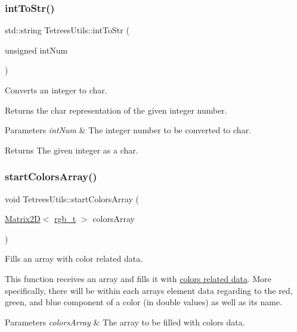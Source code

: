 \subsubsection{\texorpdfstring{int\+To\+Str()}{intToStr()}}
{\footnotesize\ttfamily std\+::string Tetrees\+Utils\+::int\+To\+Str (\begin{DoxyParamCaption}\item[{unsigned}]{int\+Num }\end{DoxyParamCaption})}



Converts an integer to char. 

Returns the char representation of the given integer number. 
\begin{DoxyParams}{Parameters}
{\em int\+Num} & The integer number to be converted to char. \\
\hline
\end{DoxyParams}
\begin{DoxyReturn}{Returns}
The given integer as a char. 
\end{DoxyReturn}
\mbox{\label{classTetreesUtils_afaeab256a68024309eefbbdfae158397}} 
\subsubsection{\texorpdfstring{start\+Colors\+Array()}{startColorsArray()}}
{\footnotesize\ttfamily void Tetrees\+Utils\+::start\+Colors\+Array (\begin{DoxyParamCaption}\item[{\hyperlink{classMatrix2D}{Matrix2D}$<$ \hyperlink{structrgb__t}{rgb\+\_\+t} $>$}]{colors\+Array }\end{DoxyParamCaption})}



Fills an array with color related data. 

This function receives an array and fills it with \hyperlink{structrgb__t}{colors related data}. More specifically, there will be within each array\textquotesingle{}s element data regarding to the red, green, and blue component of a color (in {\ttfamily double} values) as well as its name. 
\begin{DoxyParams}{Parameters}
{\em colors\+Array} & The array to be filled with colors\textquotesingle{} data. \\
\hline
\end{DoxyParams}
\mbox{\label{classTetreesUtils_a1bbb7dbec571bf3490fd74fcdacc7640}} 
